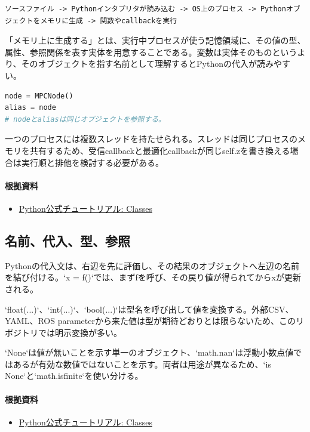 \documentclass[a4paper,11pt]{article}
\begin{document}
\begin{lstlisting}
ソースファイル -> Pythonインタプリタが読み込む -> OS上のプロセス -> Pythonオブジェクトをメモリに生成 -> 関数やcallbackを実行
\end{lstlisting}


「メモリ上に生成する」とは、実行中プロセスが使う記憶領域に、その値の型、属性、参照関係を表す実体を用意することである。変数は実体そのものというより、そのオブジェクトを指す名前として理解するとPythonの代入が読みやすい。


\begin{lstlisting}[language=python]
node = MPCNode()
alias = node
# nodeとaliasは同じオブジェクトを参照する。
\end{lstlisting}


一つのプロセスには複数スレッドを持たせられる。スレッドは同じプロセスのメモリを共有するため、受信callbackと最適化callbackが同じself.zを書き換える場合は実行順と排他を検討する必要がある。

\paragraph{根拠資料}
\begin{itemize}[leftmargin=1.6em]
\item \href{https://docs.python.org/3/tutorial/classes.html}{Python公式チュートリアル: Classes}
\end{itemize}

\subsection{名前、代入、型、参照}
Pythonの代入文は、右辺を先に評価し、その結果のオブジェクトへ左辺の名前を結び付ける。`x = f()`では、まずfを呼び、その戻り値が得られてからxが更新される。


`float(...)`、`int(...)`、`bool(...)`は型名を呼び出して値を変換する。外部CSV、YAML、ROS parameterから来た値は型が期待どおりとは限らないため、このリポジトリでは明示変換が多い。


`None`は値が無いことを示す単一のオブジェクト、`math.nan`は浮動小数点値ではあるが有効な数値ではないことを示す。両者は用途が異なるため、`is None`と`math.isfinite`を使い分ける。

\paragraph{根拠資料}
\begin{itemize}[leftmargin=1.6em]
\item \href{https://docs.python.org/3/tutorial/classes.html}{Python公式チュートリアル: Classes}
\end{itemize}
\end{document}
